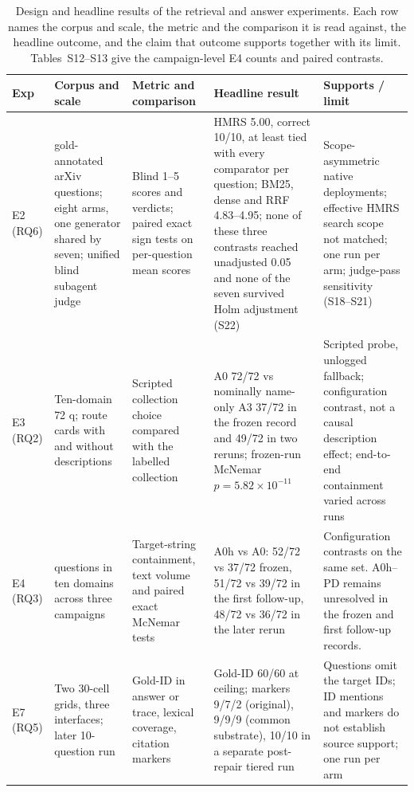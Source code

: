 \documentclass[final,5p,times,twocolumn]{elsarticle}
\begin{document}
\begin{table}[t]
\centering
\footnotesize
\setlength{\tabcolsep}{4pt}
\caption{Design and headline results of the retrieval and answer experiments.
Each row names the corpus and scale, the metric and the comparison it is read
against, the headline outcome, and the claim that outcome supports together
with its limit. Tables~S12--S13 give the campaign-level E4 counts and paired
contrasts.}
\label{tab:retrieval-design}
\begin{tabular}{@{}>{\raggedright\arraybackslash}p{}>{\raggedright\arraybackslash}p{}>{\raggedright\arraybackslash}p{}>{\raggedright\arraybackslash}p{}>{\raggedright\arraybackslash}p{}@{}}
\toprule
Exp & Corpus and scale & Metric and comparison & Headline result & Supports / limit\\
\midrule
E2 (RQ6) & 10 gold-annotated arXiv questions; eight arms, one generator shared by seven; unified blind subagent judge & Blind 1--5 scores and verdicts; paired exact sign tests on per-question mean scores & HMRS 5.00, correct 10/10, at least tied with every comparator per question; BM25, dense and RRF 4.83--4.95; none of these three contrasts reached unadjusted 0.05 and none of the seven survived Holm adjustment (S22) & Scope-asymmetric native deployments; effective HMRS search scope not matched; one run per arm; judge-pass sensitivity (S18--S21)\\
E3 (RQ2) & Ten-domain 72 q; route cards with and without descriptions & Scripted collection choice compared with the labelled collection & A0 72/72 vs nominally name-only A3 37/72 in the frozen record and 49/72 in two reruns; frozen-run McNemar $p=5.82\times10^{-11}$ & Scripted probe, unlogged fallback; configuration contrast, not a causal description effect; end-to-end containment varied across runs\\
E4 (RQ3) & 72 questions in ten domains across three campaigns & Target-string containment, text volume and paired exact McNemar tests & A0h vs A0: 52/72 vs 37/72 frozen, 51/72 vs 39/72 in the first follow-up, 48/72 vs 36/72 in the later rerun & Configuration contrasts on the same set. A0h--PD remains unresolved in the frozen and first follow-up records.\\
E7 (RQ5) & Two 30-cell grids, three interfaces; later 10-question run & Gold-ID in answer or trace, lexical coverage, citation markers & Gold-ID 60/60 at ceiling; markers 9/7/2 (original), 9/9/9 (common substrate), 10/10 in a separate post-repair tiered run & Questions omit the target IDs; ID mentions and markers do not establish source support; one run per arm\\

\end{tabular}
\end{table}
\end{document}
